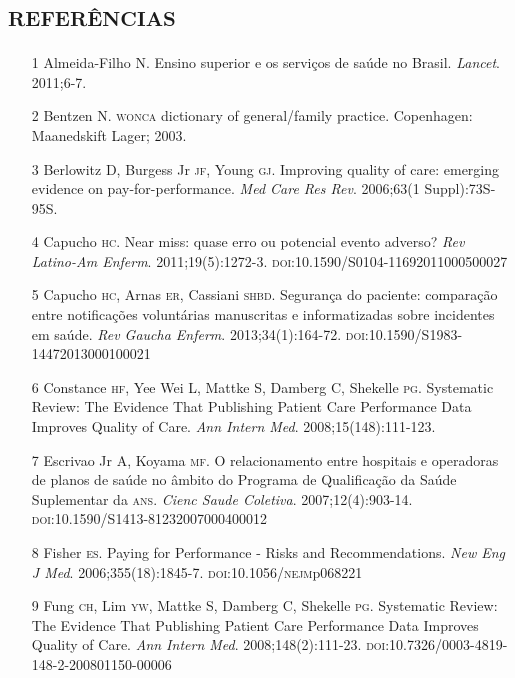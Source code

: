 \documentclass{article}
\begin{document}
\section*{\textsc{referências}}
\begin{itemize}

\item[1] Almeida-Filho N. Ensino superior e os serviços de saúde no Brasil.
\textit{Lancet}. 2011;6-7.

\item[2] Bentzen N. \textsc{wonca} dictionary of general/family practice. Copenhagen:
Maanedskift Lager; 2003.

\item[3] Berlowitz D, Burgess Jr \textsc{jf}, Young \textsc{gj}. Improving quality of care:
emerging
evidence on pay-for-performance. \textit{Med Care Res Rev}. 2006;63(1
Suppl):73S-95S.

\item[4] Capucho \textsc{hc}. Near miss: quase erro ou potencial evento adverso?
\textit{Rev
Latino-Am Enferm}. 2011;19(5):1272-3.
\textsc{doi}:10.1590/S0104-11692011000500027

\item[5] Capucho \textsc{hc}, Arnas \textsc{er}, Cassiani \textsc{shbd}. Segurança do paciente:
comparação
entre notificações voluntárias manuscritas e informatizadas sobre incidentes em
saúde.
\textit{Rev Gaucha Enferm}. 2013;34(1):164-72.
\textsc{doi}:10.1590/S1983-14472013000100021

\item[6] Constance \textsc{hf}, Yee Wei L, Mattke S, Damberg C, Shekelle \textsc{pg}. Systematic
Review: The Evidence That Publishing Patient Care Performance Data Improves
Quality of
Care. \textit{Ann Intern Med}. 2008;15(148):111-123.

\item[7] Escrivao Jr A, Koyama \textsc{mf}. O relacionamento entre hospitais e
operadoras de
planos de saúde no âmbito do Programa de Qualificação da Saúde Suplementar da
\textsc{ans}.
\textit{Cienc Saude Coletiva}. 2007;12(4):903-14.
\textsc{doi}:10.1590/S1413-81232007000400012

\item[8] Fisher \textsc{es}. Paying for Performance - Risks and Recommendations.
\textit{New
Eng J Med}. 2006;355(18):1845-7. \textsc{doi}:10.1056/\textsc{nejm}p068221

\item[9] Fung \textsc{ch}, Lim \textsc{yw}, Mattke S, Damberg C, Shekelle \textsc{pg}. Systematic Review:
The
Evidence That Publishing Patient Care Performance Data Improves Quality of Care.
\textit{Ann Intern Med}. 2008;148(2):111-23.
\textsc{doi}:10.7326/0003-4819-148-2-200801150-00006


\end{itemize}
\end{document}
